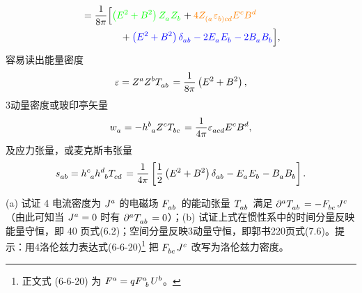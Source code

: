 \begin{xiti}
\begin{zm}
\begin{tcolorbox}[breakable,title=补充,fonttitle=\normalfont\bfseries]
\begin{equation*}
\begin{split}
						&= \frac{1}{8\pi} \Big[ {\color{green} \left( E^2 + B^2 \right) \tensor{Z}{_a} \tensor{Z}{_b}} + {\color{orange} 4 \tensor{Z}{_{(a}} \tensor{\varepsilon}{_{b)}_c_d} \tensor{E}{^c} \tensor{B}{^d}} \\
						&\qquad\qquad {}+ {\color{blue} \left( E^2 + B^2 \right) \tensor{\delta}{_a_b} - 2 \tensor{E}{_a} \tensor{E}{_b} - 2 \tensor{B}{_a} \tensor{B}{_b}} \Big],
					\end{split}
				\end{equation*}
				容易读出能量密度
				\begin{equation*}
					\varepsilon = \tensor{Z}{^a} \tensor{Z}{^b} \tensor{T}{_a_b} = \frac{1}{8\pi} \left( E^2 + B^2 \right),
				\end{equation*}
				3动量密度或玻印亭矢量
				\begin{equation*}
					\tensor{w}{_a} = - \tensor{h}{^b_a} \tensor{Z}{^c} \tensor{T}{_b_c} = \frac{1}{4\pi} \tensor{\varepsilon}{_a_c_d} \tensor{E}{^c} \tensor{B}{^d},
				\end{equation*}
				及应力张量，或麦克斯韦张量
				\begin{equation*}
					\tensor{s}{_a_b} = \tensor{h}{^c_a} \tensor{h}{^d_b} \tensor{T}{_c_d} = \frac{1}{4\pi} \left[ \frac{1}{2} \left( E^2 + B^2 \right) \tensor{\delta}{_a_b} - \tensor{E}{_a} \tensor{E}{_b} - \tensor{B}{_a} \tensor{B}{_b} \right].
				\end{equation*}
			\end{tcolorbox}
		\end{zm}

	\item (a) 试证 4 电流密度为 $\tensor{J}{^a}$ 的电磁场 $\tensor{F}{_a_b}$ 的能动张量 $\tensor{T}{_a_b}$ 满足 $\tensor{\partial}{^a} \tensor{T}{_a_b} = - \tensor{F}{_b_c} \tensor{J}{^c}$（由此可知当 $\tensor{J}{^a}=0$ 时有 $\tensor{\partial}{^a} \tensor{T}{_a_b} = 0$）；(b) 试证上式在惯性系中的时间分量反映能量守恒，即\cite{guo1995} 40 页式(6.2)；空间分量反映3动量守恒，即郭书220页式(7.6)。提示：用4洛伦兹力表达式(6-6-20)\footnote{正文式 (6-6-20) 为 $\tensor{F}{^a} = q \tensor{F}{^a_b} \tensor{U}{^b}$。} 把 $\tensor{F}{_b_c} \tensor{J}{^c}$ 改写为洛伦兹力密度。
	

\end{xiti}
